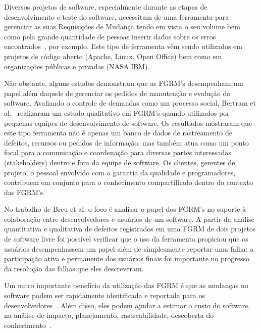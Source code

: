 Diversos projetos de software, especialmente durante as etapas de desenvolvimento e teste do
software, necessitam de uma ferramenta para gerenciar as suas Requisições de Mudança tendo em vista
o seu volume bem como pela grande quantidade de pessoas inserir dados sobre os erros
encontrados~\cite{1407819}, por exemplo. Este tipo de ferramenta vêm sendo utilizados em projetos de
código aberto (Apache, Linux, Open Office) bem como em organizações públicas e privadas
(NASA,IBM).

Não obstante, alguns estudos demonstram que as FGRM's desempenham um papel além daquele de gerenciar
os pedidos de manutenção e evolução do software. Avaliando o controle de demandas como um processo
social, Bertram et al.~\cite{Bertram:2010:CCB:1718918.1718972} realizaram um estudo qualitativo em
FGRM's quando utilizados por pequenas equipes de desenvolvimento de software. Os resultados
mostraram que este tipo ferramenta não é apenas um banco de dados de rastreamento de defeitos,
recursos ou pedidos de informação, mas também atua como um ponto focal para a comunicação e
coordenação para diversas partes interessadas (stakeholders) dentro e fora da equipe de software. Os
clientes, gerentes de projeto, o pessoal envolvido com a garantia da qualidade e programadores,
contribuem em conjunto para o conhecimento compartilhado dentro do contexto das FGRM's.
 
No trabalho de Breu et al.\cite{Breu:2010:INB:1718918.1718973} o foco é analisar o papel dos FGRM's
no suporte à colaboração entre desenvolvedores e usuários de um software. A partir da análise
quantitativa e qualitativa de defeitos registrados em uma FGRM de dois projetos de software livre
foi possível verificar que o uso da ferramenta propiciou que os usuários desempenhassem um papel
além de simplesmente reportar uma falha: a participação ativa e permanente dos usuários finais foi
importante no progresso da resolução das falhas que eles descreveram.


Um outro importante benefício da utilização das FGRM é que as mudanças no software podem ser
rapidamente identificada e reportada para os desenvolvedores~\cite{anvik2005coping}. Além disso, eles podem ajudar a estimar
o custo do software, na análise de impacto, planejamento, rastreabilidade, descoberta do
conhecimento~\cite{cavalcanti2013bug}.

